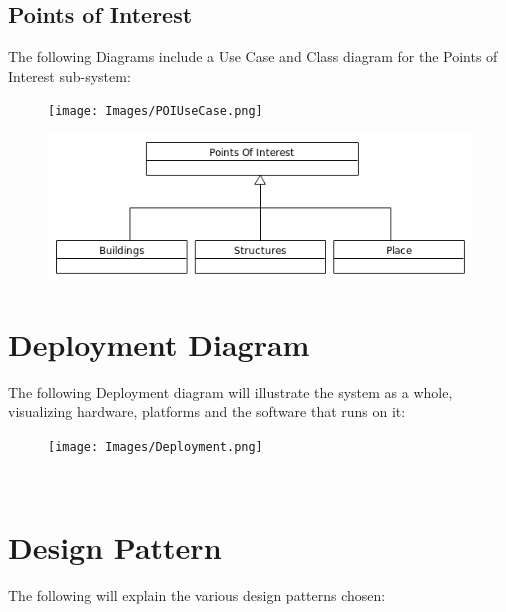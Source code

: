 \documentclass{article}
\begin{document}
	\subsection{Points of Interest}
	The following Diagrams include a Use Case and Class diagram for the Points of Interest sub-system:
	\begin{figure}[h]
  		\texttt{[image: Images/POIUseCase.png]}
	\end{figure}
	\begin{figure}[h]
  		\includegraphics[width=\textwidth]{Images/POIClass.png}
	\end{figure}
	
\section{Deployment Diagram}
The following Deployment diagram will illustrate the system as a whole, visualizing hardware, platforms and the software that runs on it:
	\begin{figure}[h]
  		\texttt{[image: Images/Deployment.png]}
	\end{figure}
	\mbox{}\\
	\bigskip

\section{Design Pattern}
The following will explain the various design patterns chosen:
\end{document}
